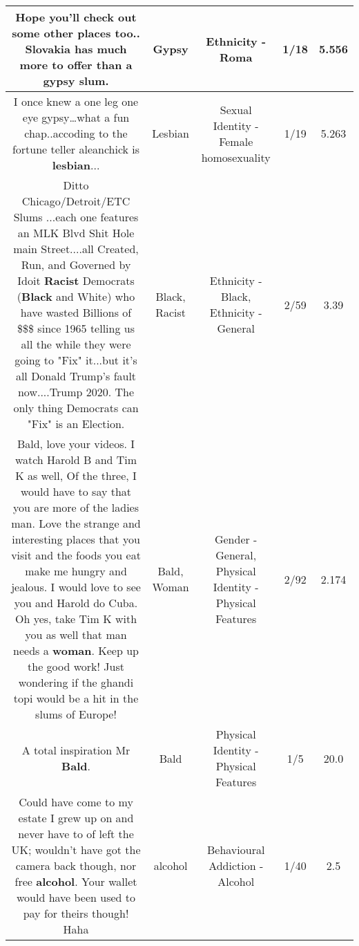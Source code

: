 \documentclass[11pt]{article}
\newlength\mylength
\begin{document}
\begin{center}
\begin{longtable}{|C{.65\mylength}|C{.30\mylength}|C{.12\mylength}|C{.12\mylength}|C{.12\mylength}|}
  \small Hope you'll check out some other places too.. Slovakia has much more to offer than a \textbf{gypsy} slum.\normalsize   & Gypsy & Ethnicity - Roma & 1/18 & 5.556 \\  \hline
  \small I once knew a one leg one eye gypsy…what a fun chap..accoding to the fortune teller aleanchick is \textbf{lesbian}...\normalsize   & Lesbian & Sexual Identity - Female homosexuality & 1/19 & 5.263 \\  \hline
  \small Ditto Chicago/Detroit/ETC  Slums ...each one features an MLK Blvd Shit Hole main Street....all Created, Run, and  Governed by Idoit \textbf{Racist} Democrats (\textbf{Black} and White) who have wasted Billions of \$\$\$ since 1965 telling us all the while they were going to "Fix" it...but it's all Donald Trump's fault now....Trump 2020. The only thing Democrats can "Fix" is an Election.\normalsize   & Black, Racist & Ethnicity - Black, Ethnicity - General & 2/59 & 3.39 \\  \hline
  \small Bald, love your videos.  I watch  Harold B and Tim K as well, Of the three, I would have to say that you are more  of the ladies man.  Love the strange and interesting places that you visit and the foods you eat make me hungry and jealous.  I  would love to see you and Harold do Cuba.  Oh  yes, take Tim K with you as well that man needs a \textbf{woman}. Keep up the good work! Just wondering if the ghandi topi would be a hit in the slums of Europe!\normalsize   & Bald, Woman & Gender - General, Physical Identity - Physical Features & 2/92 & 2.174 \\  \hline
  \small A total inspiration Mr \textbf{Bald}.\normalsize   & Bald & Physical Identity - Physical Features & 1/5 & 20.0 \\  \hline
  \small Could have come to my estate I grew up on and never have to of left the UK; wouldn't have got the camera back though, nor free \textbf{alcohol}. Your wallet would have been used to pay for theirs though! Haha\normalsize   & alcohol & Behavioural Addiction - Alcohol & 1/40 & 2.5 \\  \hline

\end{longtable}
\end{center}
\end{document}
